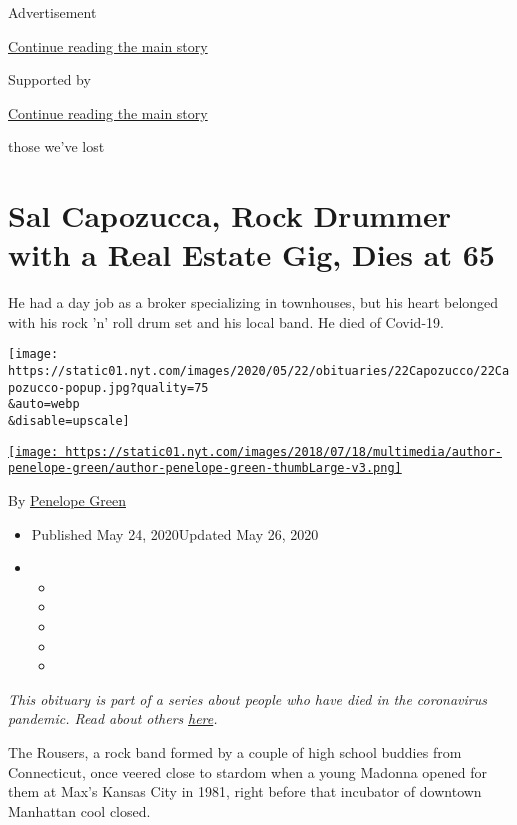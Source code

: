 Advertisement

\protect\hyperlink{after-top}{Continue reading the main story}

Supported by

\protect\hyperlink{after-sponsor}{Continue reading the main story}

those we've lost

\hypertarget{sal-capozucca-rock-drummer-with-a-real-estate-gig-dies-at-65}{%
\section{Sal Capozucca, Rock Drummer with a Real Estate Gig, Dies at
65}\label{sal-capozucca-rock-drummer-with-a-real-estate-gig-dies-at-65}}

He had a day job as a broker specializing in townhouses, but his heart
belonged with his rock 'n' roll drum set and his local band. He died of
Covid-19.

\texttt{[image: https://static01.nyt.com/images/2020/05/22/obituaries/22Capozucco/22Capozucco-popup.jpg?quality=75\\\&auto=webp\\\&disable=upscale]}

\href{https://www.nytimes.com/by/penelope-green}{\texttt{[image: https://static01.nyt.com/images/2018/07/18/multimedia/author-penelope-green/author-penelope-green-thumbLarge-v3.png]}}

By \href{https://www.nytimes.com/by/penelope-green}{Penelope Green}

\begin{itemize}
\item
  Published May 24, 2020Updated May 26, 2020
\item
  \begin{itemize}
  \item
  \item
  \item
  \item
  \item
  \end{itemize}
\end{itemize}

\emph{This obituary is part of a series about people who have died in
the coronavirus pandemic. Read about others}
\href{https://www.nytimes.com/series/people-who-have-died-of-the-coronavirus}{\emph{here}}\emph{.}

The Rousers, a rock band formed by a couple of high school buddies from
Connecticut, once veered close to stardom when a young Madonna opened
for them at Max's Kansas City in 1981, right before that incubator of
downtown Manhattan cool closed.

